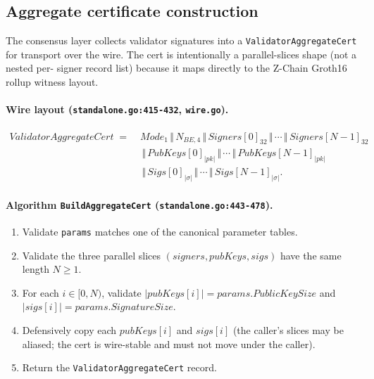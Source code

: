 \subsection{Aggregate certificate construction}
\label{sec:construction:cert}

The consensus layer collects validator signatures into a
\texttt{ValidatorAggregateCert} for transport over the wire. The
cert is intentionally a parallel-slices shape (not a nested per-
signer record list) because it maps directly to the Z-Chain Groth16
rollup witness layout.

\paragraph{Wire layout
(\texttt{standalone.go:415-432}, \texttt{wire.go}).}
\begin{align*}
  \mathit{ValidatorAggregateCert} \;=\; &
    \mathit{Mode}_1 \,\Vert\, N_{\mathit{BE},4} \,\Vert\,
    \mathit{Signers}[0]_{32} \,\Vert\, \cdots \,\Vert\,
    \mathit{Signers}[N-1]_{32} \\
  & \,\Vert\, \mathit{PubKeys}[0]_{|pk|} \,\Vert\, \cdots \,\Vert\,
    \mathit{PubKeys}[N-1]_{|pk|} \\
  & \,\Vert\, \mathit{Sigs}[0]_{|\sigma|} \,\Vert\, \cdots \,\Vert\,
    \mathit{Sigs}[N-1]_{|\sigma|}.
\end{align*}

\paragraph{Algorithm \texttt{BuildAggregateCert}
(\texttt{standalone.go:443-478}).}
\begin{enumerate}[leftmargin=2em,nosep]
  \item Validate \texttt{params} matches one of the canonical
        parameter tables.
  \item Validate the three parallel slices
        $(\mathit{signers}, \mathit{pubKeys}, \mathit{sigs})$ have
        the same length $N \ge 1$.
  \item For each $i \in [0, N)$, validate $|pubKeys[i]| =
        params.PublicKeySize$ and $|sigs[i]| = params.SignatureSize$.
  \item Defensively copy each $pubKeys[i]$ and $sigs[i]$ (the
        caller's slices may be aliased; the cert is wire-stable and
        must not move under the caller).
  \item Return the \texttt{ValidatorAggregateCert} record.
\end{enumerate}

